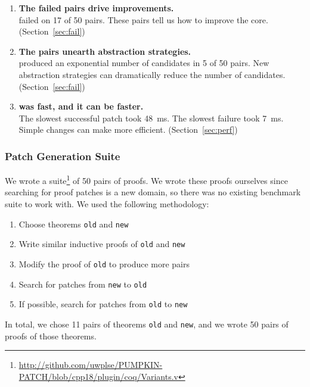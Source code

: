 \begin{enumerate}
\item \textbf{The failed pairs drive improvements.} \\
\sysname failed on 17 of 50 pairs. These pairs tell us how to improve the core. (Section~\ref{sec:fail})
\item \textbf{The pairs unearth abstraction strategies.} \\
\sysname produced an exponential number of candidates in 5 of 50 pairs.
New abstraction strategies can dramatically reduce the number of candidates. (Section~\ref{sec:fail})
\item \textbf{\sysname was fast, and it can be faster.} \\
The slowest successful patch took \SI{48}{\ms}. The slowest failure took \SI{7}{\ms}.
Simple changes can make \sysname more efficient. (Section~\ref{sec:perf})
\end{enumerate}

\subsubsection{Patch Generation Suite}
\label{sec:suite}

We wrote a suite\footnote{\url{http://github.com/uwplse/PUMPKIN-PATCH/blob/cpp18/plugin/coq/Variants.v}} of 50 pairs of proofs.
We wrote these proofs ourselves since searching for proof patches is a new domain,
so there was no existing benchmark suite to work with.
We used the following methodology:

\begin{enumerate}
\item Choose theorems \lstinline{old} and \lstinline{new}
\item Write similar inductive proofs of \lstinline{old} and \lstinline{new}
\item Modify the proof of \lstinline{old} to produce more pairs
\item Search for patches from \lstinline{new} to \lstinline{old}
\item If possible, search for patches from \lstinline{old} to \lstinline{new}
\end{enumerate}

In total, we chose 11 pairs of theorems \lstinline{old} and \lstinline{new}, and we wrote
50 pairs of proofs of those theorems.

